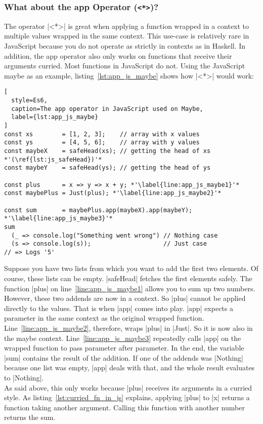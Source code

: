 \subsubsection{What about the app Operator (\lstinline{<*>})?} %
\label{subsub:Which operations do not fit JavaScript?}
The operator |<*>| is great when applying a function wrapped in a context to
multiple values wrapped in the same context. This use-case is relatively rare
in JavaScript because you do not operate as strictly in contexts as in Haskell.
In addition, the app operator also only works on functions that receive their
arguments curried. Most functions in JavaScript do not. Using the JavaScript
maybe as an example, listing~\ref{lst:app_js_maybe} shows how |<*>| would
work:

\begin{lstlisting}[
  style=Es6,
  caption=The app operator in JavaScript used on Maybe,
  label={lst:app_js_maybe}
]
const xs        = [1, 2, 3];    // array with x values
const ys        = [4, 5, 6];    // array with y values
const maybeX    = safeHead(xs); // getting the head of xs *'(\ref{lst:js_safeHead})'*
const maybeY    = safeHead(ys); // getting the head of ys

const plus      = x => y => x + y; *'\label{line:app_js_maybe1}'*
const maybePlus = Just(plus); *'\label{line:app_js_maybe2}'*

const sum       = maybePlus.app(maybeX).app(maybeY); *'\label{line:app_js_maybe3}'*
sum 
  (_ => console.log("Something went wrong") // Nothing case
  (s => console.log(s));                    // Just case 
// => Logs '5'
\end{lstlisting}
Suppose you have two lists from which you want to add the first two elements.
Of course, these lists can be empty. |safeHead| fetches the first elements
safely. The function |plus| on line~\ref{line:app_js_maybe1} allows you to sum
up two numbers. However, these two addends are now in a context. So |plus|
cannot be applied directly to the values. That is when |app| comes into play.
|app| expects a parameter in the same context as the original wrapped function.
Line~\ref{line:app_js_maybe2}, therefore, wraps |plus| in |Just|. So it is
now also in the maybe context. Line~\ref{line:app_js_maybe3} repeatedly calls
|app| on the wrapped function to pass parameter after parameter. In the end,
the variable |sum| contains the result of the addition. If one of the addends
was |Nothing| because one list was empty, |app| deals with that, and the whole
result evaluates to |Nothing|. \\ 
As said above, this only works because |plus| receives its arguments in a
curried style. As listing~\ref{lst:curried_fn_in_js} explains, applying |plus|
to |x| returns a function taking another argument. Calling this function with
another number returns the sum.

